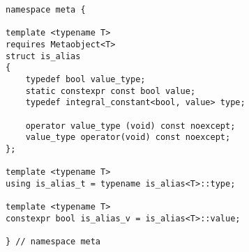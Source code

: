 
\begin{verbatim}
namespace meta {

template <typename T>
requires Metaobject<T>
struct is_alias
{
	typedef bool value_type;
	static constexpr const bool value;
	typedef integral_constant<bool, value> type;

	operator value_type (void) const noexcept;
	value_type operator(void) const noexcept;
};

template <typename T>
using is_alias_t = typename is_alias<T>::type;

template <typename T>
constexpr bool is_alias_v = is_alias<T>::value;

} // namespace meta
\end{verbatim}
